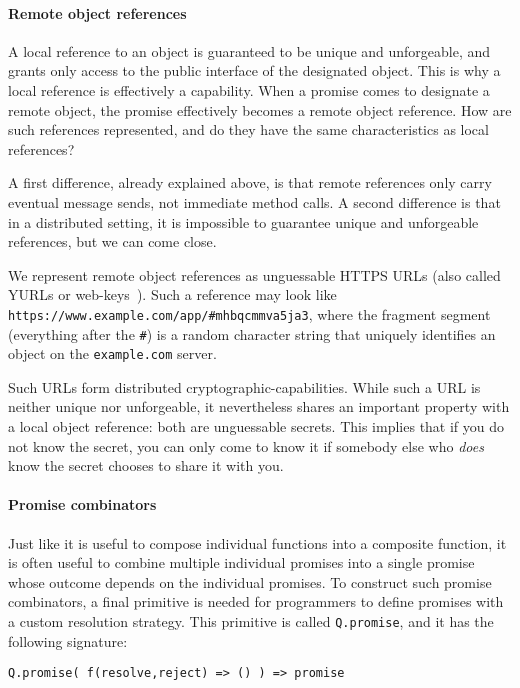 \documentclass{llncs}
\begin{document}
\paragraph{Remote object references}

A local reference to an object is guaranteed to be unique and unforgeable, and grants only access to the public interface of the designated object. This is why a local reference is effectively a capability. When a promise comes to designate a remote object, the promise effectively becomes a remote object reference. How are such references represented, and do they have the same characteristics as local references?

A first difference, already explained above, is that remote references only carry eventual message sends, not immediate method calls. A second difference is that in a distributed setting, it is impossible to guarantee unique and unforgeable references, but we can come close.

We represent remote object references as unguessable HTTPS URLs (also called YURLs or web-keys~\cite{mashing_with_permission}). Such a reference may look like \texttt{https://www.example.com/app/\#mhbqcmmva5ja3}, where the fragment segment (everything after the \texttt{\#}) is a random character string that uniquely identifies an object on the \texttt{example.com} server.

Such URLs form distributed cryptographic-capabilities. While such a URL is neither unique nor unforgeable, it nevertheless shares an important property with a local object reference: both are unguessable secrets. This implies that if you do not know the secret, you can only come to know it if somebody else who \emph{does} know the secret chooses to share it with you.

\paragraph{Promise combinators}

Just like it is useful to compose individual functions into a composite function, it is often useful to combine multiple individual promises into a single promise whose outcome depends on the individual promises. To construct such promise combinators, a final primitive is needed for programmers to define promises with a custom resolution strategy. This primitive is called \texttt{Q.promise}, and it has the following signature:

\begin{verbatim}
Q.promise( f(resolve,reject) => () ) => promise
\end{verbatim}
\end{document}

